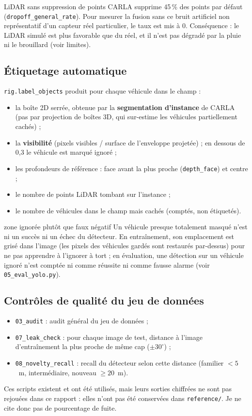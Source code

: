 \documentclass[11pt,a4paper]{article}
\providecommand{\og}{\guillemotleft\nobreakspace}
\providecommand{\fg}{\nobreakspace\guillemotright}
\newcommand{\code}[1]{\texttt{#1}}
\begin{document}
\begin{choix}{LiDAR sans suppression de points}
CARLA supprime 45\,\% des points par d\'efaut (\code{dropoff\_general\_rate}). Pour mesurer la fusion sans ce bruit artificiel non
repr\'esentatif d'un capteur r\'eel particulier, le taux est mis \`a 0. Cons\'equence : le LiDAR simul\'e est plus favorable que du r\'eel,
et il n'est pas d\'egrad\'e par la pluie ni le brouillard (voir limites).
\end{choix}

\subsection{\'Etiquetage automatique}
\code{rig.label\_objects} produit pour chaque v\'ehicule dans le champ :
\begin{itemize}
\item la bo\^ite 2D serr\'ee, obtenue par la \textbf{segmentation d'instance} de CARLA (pas par projection de bo\^ites 3D, qui sur-estime les v\'ehicules partiellement cach\'es) ;
\item la \textbf{visibilit\'e} (pixels visibles / surface de l'enveloppe projet\'ee) ; en dessous de 0,3 le v\'ehicule est marqu\'e \og ignor\'e \fg{} ;
\item les profondeurs de r\'ef\'erence : face avant la plus proche (\code{depth\_face}) et centre ;
\item le nombre de points LiDAR tombant sur l'instance ;
\item le nombre de v\'ehicules dans le champ mais cach\'es (compt\'es, non \'etiquet\'es).
\end{itemize}
\begin{choix}{zone \og ignor\'ee \fg{} plut\^ot que faux n\'egatif}
Un v\'ehicule presque totalement masqu\'e n'est ni un succ\`es ni un \'echec du d\'etecteur. En entra\^inement, son emplacement est gris\'e
dans l'image (les pixels des v\'ehicules gard\'es sont restaur\'es par-dessus) pour ne pas apprendre \`a l'ignorer \`a tort ; en \'evaluation,
une d\'etection sur un v\'ehicule ignor\'e n'est compt\'ee ni comme r\'eussite ni comme fausse alarme (voir \code{05\_eval\_yolo.py}).
\end{choix}

\subsection{Contr\^oles de qualit\'e du jeu de donn\'ees}
\begin{itemize}
\item \code{03\_audit} : audit g\'en\'eral du jeu de donn\'ees ;
\item \code{07\_leak\_check} : pour chaque image de test, distance \`a l'image d'entra\^inement la plus proche de m\^eme cap ($\pm30^\circ$) ;
\item \code{08\_novelty\_recall} : recall du d\'etecteur selon cette distance (familier $<5$~m, interm\'ediaire, nouveau $\geq20$~m).
\end{itemize}
Ces scripts existent et ont \'et\'e utilis\'es, mais leurs sorties chiffr\'ees ne sont pas rejou\'ees dans ce rapport : elles n'ont pas \'et\'e
conserv\'ees dans \code{reference/}. Je ne cite donc pas de pourcentage de fuite.
\end{document}
